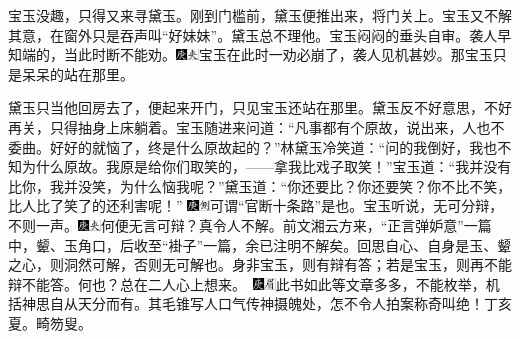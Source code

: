 宝玉没趣，只得又来寻黛玉。刚到门槛前，黛玉便推出来，将门关上。宝玉又不解其意，在窗外只是吞声叫“好妹妹”。黛玉总不理他。宝玉闷闷的垂头自审。袭人早知端的，当此时断不能劝。{\includegraphics[width=3mm]{../Images/00004}\includegraphics[width=3mm]{../Images/00012}\footnotesize \kaishu 宝玉在此时一劝必崩了，袭人见机甚妙。}那宝玉只是呆呆的站在那里。

黛玉只当他回房去了，便起来开门，只见宝玉还站在那里。黛玉反不好意思，不好再关，只得抽身上床躺着。宝玉随进来问道：“凡事都有个原故，说出来，人也不委曲。好好的就恼了，终是什么原故起的？”林黛玉冷笑道：“问的我倒好，我也不知为什么原故。我原是给你们取笑的，------拿我比戏子取笑！”宝玉道：“我并没有比你，我并没笑，为什么恼我呢？”黛玉道：“你还要比？你还要笑？你不比不笑，比人比了笑了的还利害呢！”{
\includegraphics[width=3mm]{../Images/00004}\includegraphics[width=3mm]{../Images/00011}\footnotesize \kaishu 可谓“官断十条路”是也。}宝玉听说，无可分辩，不则一声。{\includegraphics[width=3mm]{../Images/00004}\includegraphics[width=3mm]{../Images/00012}\footnotesize \kaishu 何便无言可辩？真令人不解。前文湘云方来，“正言弹妒意”一篇中，颦、玉角口，后收至“褂子”一篇，余已注明不解矣。回思自心、自身是玉、颦之心，则洞然可解，否则无可解也。身非宝玉，则有辩有答；若是宝玉，则再不能辩不能答。何也？总在二人心上想来。　{\includegraphics[width=3mm]{../Images/00004}\includegraphics[width=3mm]{../Images/00010}\footnotesize \kaishu 此书如此等文章多多，不能枚举，机括神思自从天分而有。其毛锥写人口气传神摄魄处，怎不令人拍案称奇叫绝！丁亥夏。畸笏叟。}}

